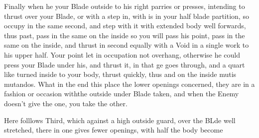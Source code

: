 Finally when he your Blade outside to his right parries or presses,
intending to thrust over your Blade, or with a step in, with is in
your half blade partition, so occupy in the same second, and step with
it with extended body well forwards, thus past, pass in the same on
the inside so you will pass his point, pass in the same on the inside,
and thrust in second equally with a Void in a single work to his upper
half. Your point let in occupation not overhang, otherwise he could
press your Blade under his, and thrust it, in that ge goes through,
and a quart like turned inside to your body, thrust quickly, thus and
on the inside mutis mutandos. What in the end this place the lower
openings concerned, they are in a fashion or occasion withthe outside
under Blade taken, and when the Enemy doesn't give the one, you take
the other.


Here folllows Third, which against a high outside guard, over the BLde
well stretched, there in one gives fewer openings, with half the body become